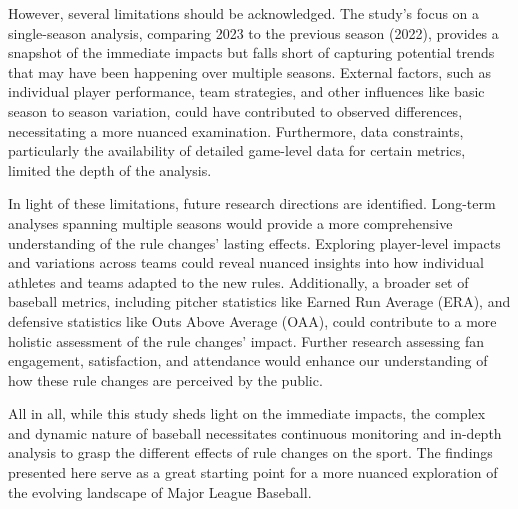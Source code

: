 \documentclass[12pt]{article}
\begin{document}
However, several limitations should be acknowledged. The study's focus on a single-season
analysis, comparing 2023 to the previous season (2022), provides a snapshot of the
immediate impacts but falls short of capturing potential trends that may have been
happening over multiple seasons. External factors, such as individual player performance,
team strategies, and other influences like basic season to season variation, could have
contributed to observed differences, necessitating a more nuanced examination.
Furthermore, data constraints, particularly the availability of detailed game-level
data for certain metrics, limited the depth of the analysis.

In light of these limitations, future research directions are identified. Long-term
analyses spanning multiple seasons would provide a more comprehensive understanding
of the rule changes' lasting effects. Exploring player-level impacts and variations
across teams could reveal nuanced insights into how individual athletes and teams
adapted to the new rules. Additionally, a broader set of baseball metrics, including
pitcher statistics like Earned Run Average (ERA), and defensive statistics like
Outs Above Average (OAA), could contribute to a more holistic assessment of the rule
changes' impact. Further research assessing fan engagement, satisfaction, and attendance
would enhance our understanding of how these rule changes are perceived by the public.

All in all, while this study sheds light on the immediate impacts, the complex and
dynamic nature of baseball necessitates continuous monitoring and in-depth
analysis to grasp the different effects of rule changes on the sport. The findings
presented here serve as a great starting point for a more nuanced exploration of the
evolving landscape of Major League Baseball.




\end{document}
